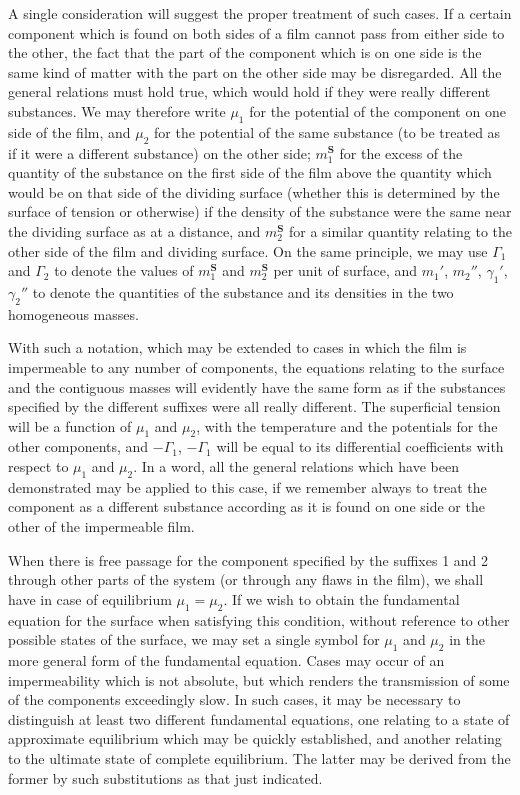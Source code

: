 \documentclass[12pt]{article}
\begin{document}
A single consideration will suggest the proper treatment of such cases. If a certain component which is found on both sides of a film cannot pass from either side to the other, the fact that the part of the component which is on one side is the same kind of matter with the part on the other side may be disregarded. All the general relations must hold true, which would hold if they were really different substances. We may therefore write $\mu_1$ for the potential of the component on one side of the film, and $\mu_2$ for the potential of the same substance (to be treated as if it were a different substance) on the other side; $m_1^\mathbf{S}$ for the excess of the quantity of the substance on the first side of the film above the quantity which would be on that side of the dividing surface (whether this is determined by the surface of tension or otherwise) if the density of the substance were the same near the dividing surface as at a distance, and $m_2^\mathbf{S}$ for a similar quantity relating to the other side of the film and dividing surface. On the same principle, we may use $\Gamma_1$ and $\Gamma_2$ to denote the values of $m_1^\mathbf{S}$ and $m_2^\mathbf{S}$ per unit of surface, and $m_1'$, $m_2''$, $\gamma_1'$, $\gamma_2''$ to denote the quantities of the substance and its densities in the two homogeneous masses.

With such a notation, which may be extended to cases in which the film is impermeable to any number of components, the equations relating to the surface and the contiguous masses will evidently have the same form as if the substances specified by the different suffixes were all really different. The superficial tension will be a function of $\mu_1$ and $\mu_2$, with the temperature and the potentials for the other components, and $-\Gamma_1$, $-\Gamma_1$ will be equal to its differential coefficients with respect to $\mu_1$ and $\mu_2$. In a word, all the general relations which have been demonstrated may be applied to this case, if we remember always to treat the component as a different substance according as it is found on one side or the other of the impermeable film.

When there is free passage for the component specified by the suffixes 1 and 2 through other parts of the system (or through any flaws in the film), we shall have in case of equilibrium $\mu_1=\mu_2$. If we wish to obtain the fundamental equation for the surface when satisfying this condition, without reference to other possible states of the surface, we may set a single symbol for $\mu_1$ and $\mu_2$ in the more general form of the fundamental equation. Cases may occur of an impermeability which is not absolute, but which renders the transmission of some of the components exceedingly slow. In such cases, it may be necessary to distinguish at least two different fundamental equations, one relating to a state of approximate equilibrium which may be quickly established, and another relating to the ultimate state of complete equilibrium. The latter may be derived from the former by such substitutions as that just indicated.
\end{document}
